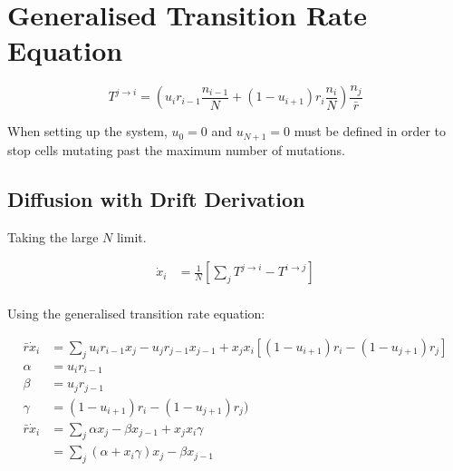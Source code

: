 \documentclass[a4paper]{article}
\begin{document}
\section{Generalised Transition Rate Equation}

\begin{equation}
T^{j\rightarrow i} = \left(u_i r_{i-1} \frac{n_{i-1}}{N} + \left(1 - u_{i+1} \right) r_i \frac{n_i}{N} \right) \frac{n_j}{\bar{r}}
\end{equation}

When setting up the system, $u_0 = 0$ and $u_{N+1} = 0$ must be defined in order to stop cells mutating past the maximum number of mutations. 

\subsection{Diffusion with Drift Derivation}

Taking the large $N$ limit. 

\begin{align*}
 \dot{x} _i & = \frac{1}{N} \left[ \sum _j T^{j \rightarrow i} - T^{i \rightarrow j} \right]\\
\end{align*}

Using the generalised transition rate equation:

\begin{align*}
\bar{r} \dot{x}_i & = \sum _j u _i r_{i-1} x_j - u_j r_{j-1} x_{j-1} + x_j x_i \left[ ( 1- u_{i+1} ) r_i - (1 - u_{j+1} ) r_j \right] \\
\alpha & = u _i r _{i-1} \\
\beta & = u_j r_{j-1} \\
\gamma & = ( 1 - u_{i+1} ) r_i - ( 1- u_{j+1} )r_j ) \\
\bar{r} \dot{x}_i & = \sum _j \alpha x_j - \beta x_{j-1} + x_j x_i \gamma \\
& = \sum _j (\alpha + x_i \gamma ) x _j - \beta x_{j-1}
\end{align*}
\end{document}
